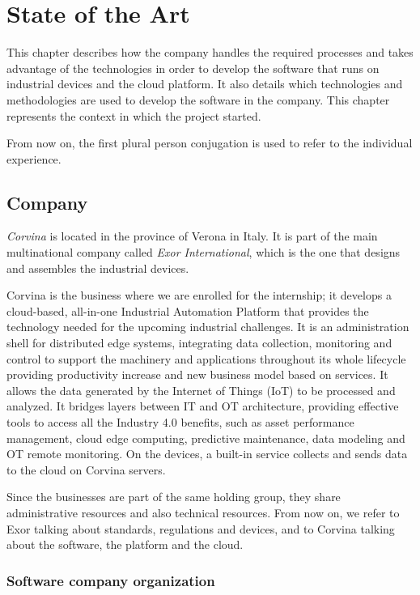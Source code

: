 \chapter{State of the Art}

This chapter describes how the company handles the required processes and takes advantage of the technologies in order to develop the software that runs on industrial devices and the cloud platform. It also details which technologies and methodologies are used to develop the software in the company. This chapter represents the context in which the project started.

From now on, the first plural person conjugation is used to refer to the individual experience.

\section{Company}

\textit{Corvina} is located in the province of Verona in Italy. It is part of the main multinational company called \textit{Exor International}, which is the one that designs and assembles the industrial devices.

Corvina is the business where we are enrolled for the internship; it develops a cloud-based, all-in-one Industrial Automation Platform that provides the technology needed for the upcoming industrial challenges. It is an administration shell for distributed edge systems, integrating data collection, monitoring and control to support the machinery and applications throughout its whole lifecycle providing productivity increase and new business model based on services. It allows the data generated by the Internet of Things (IoT) to be processed and analyzed. It bridges layers between IT and OT architecture, providing effective tools to access all the Industry 4.0 benefits, such as asset performance management, cloud edge computing, predictive maintenance, data modeling and OT remote monitoring. On the devices, a built-in service collects and sends data to the cloud on Corvina servers.

Since the businesses are part of the same holding group, they share administrative resources and also technical resources. From now on, we refer to Exor talking about standards, regulations and devices, and to Corvina talking about the software, the platform and the cloud.

\subsection{Software company organization}

